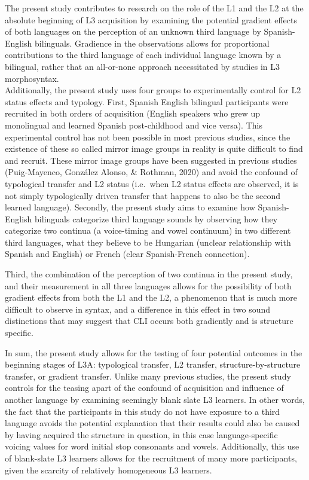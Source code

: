 \documentclass[
  english,
  man]{apa6}
\begin{document}
The present study contributes to research on the role of the L1 and the L2 at the absolute beginning of L3 acquisition by examining the potential gradient effects of both languages on the perception of an unknown third language by Spanish-English bilinguals. Gradience in the observations allows for proportional contributions to the third language of each individual language known by a bilingual, rather that an all-or-none approach necessitated by studies in L3 morphosyntax.\\
Additionally, the present study uses four groups to experimentally control for L2 status effects and typology.
First, Spanish English bilingual participants were recruited in both orders of acquisition (English speakers who grew up monolingual and learned Spanish post-childhood and vice versa). This experimental control has not been possible in most previous studies, since the existence of these so called mirror image groups in reality is quite difficult to find and recruit. These mirror image groups have been suggested in previous studies (Puig-Mayenco, González Alonso, \& Rothman, 2020) and avoid the confound of typological transfer and L2 status (i.e.~when L2 status effects are observed, it is not simply typologically driven transfer that happens to also be the second learned language).
Secondly, the present study aims to examine how Spanish-English bilinguals categorize third language sounds by observing how they categorize two continua (a voice-timing and vowel continuum) in two different third languages, what they believe to be Hungarian (unclear relationship with Spanish and English) or French (clear Spanish-French connection).

Third, the combination of the perception of two continua in the present study, and their measurement in all three languages allows for the possibility of both gradient effects from both the L1 and the L2, a phenomenon that is much more difficult to observe in syntax, and a difference in this effect in two sound distinctions that may suggest that CLI occurs both gradiently and is structure specific.

In sum, the present study allows for the testing of four potential outcomes in the beginning stages of L3A: typological transfer, L2 transfer, structure-by-structure transfer, or gradient transfer. Unlike many previous studies, the present study controls for the teasing apart of the confound of acquisition and influence of another language by examining seemingly blank slate L3 learners. In other words, the fact that the participants in this study do not have exposure to a third language avoids the potential explanation that their results could also be caused by having acquired the structure in question, in this case language-specific voicing values for word initial stop consonants and vowels. Additionally, this use of blank-slate L3 learners allows for the recruitment of many more participants, given the scarcity of relatively homogeneous L3 learners.
\end{document}
